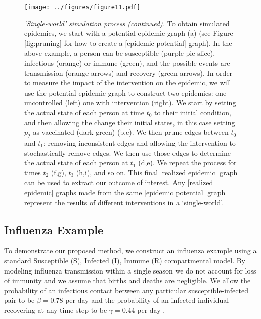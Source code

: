 \documentclass[PTRSB]{rsos}
\makeatletter
\def\checkGraphicsWidth{\ifdim\Gin@nat@width>\linewidth
	\tsGraphicsScaleX\linewidth\else\Gin@nat@width\fi}
\let\ts@includegraphics\includegraphics
\renewcommand{\includegraphics}[1]{\ts@includegraphics[width=\checkGraphicsWidth]{#1}}
\makeatother
\begin{document}
\begin{multicols}{2}
\begin{figure}[hp]
\texttt{[image: ../figures/figure11.pdf]}
\caption{\textit{‘Single-world’ simulation process (continued).}
  To obtain simulated epidemics, we start with a potential epidemic graph (a) (see Figure \ref{fig:pruning} for how to create a [epidemic potential] graph).
  In the above example, a person can be susceptible (purple pie slice), infectious (orange) or immune (green), and the possible events are transmission (orange arrows) and recovery (green arrows). %
  In order to measure the impact of the intervention on the epidemic, we will use the potential epidemic graph to construct two epidemics: one uncontrolled (left) one with intervention (right).
  We start by setting the actual state of each person at time $t_0$ to their initial condition, and then allowing the change their initial states, in this case setting $p_2$ as vaccinated (dark green) (b,c).
  We then prune edges between $t_0$ and $t_1$: removing inconsistent edges and allowing the intervention to stochastically remove edges.
  We then use those edges to determine the actual state of each person at $t_1$ (d,e).
  We repeat the process for times $t_2$ (f,g), $t_3$ (h,i), and so on.
  This final [realized epidemic] graph can be used to extract our outcome of interest.
  Any [realized epidemic] graphs made from the same [epidemic potential] graph represent the results of different interventions in a `single-world'.
}
\label{fig:actualizing}
\end{figure}

\subsection*{Influenza Example}
To demonstrate our proposed method, we construct an influenza example using a standard Susceptible (S), Infected (I), Immune (R) compartmental model.
By modeling influenza transmission within a single season we do not account for loss of immunity and we assume that births and deaths are negligible.
We allow the probability of an infectious contact between any particular susceptible-infected pair to be $\beta = 0.78$ per day and the probability of an infected individual recovering at any time step to be $\gamma = 0.44$ per day \cite{forsberg-white-et-al:2009}.


\end{multicols}
\end{document}
